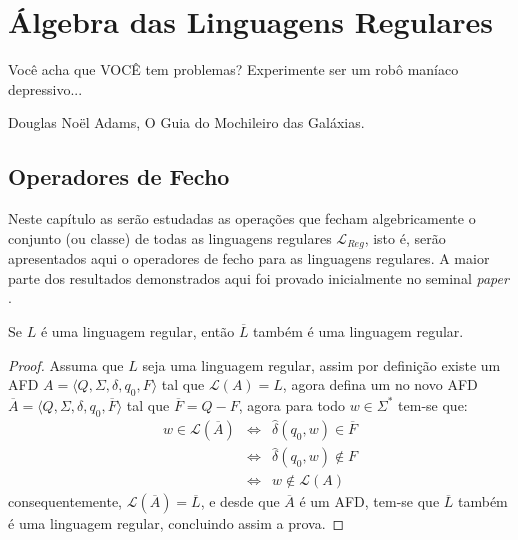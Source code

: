 \chapter{Álgebra das Linguagens Regulares}\label{cap:AlgebrasRegulares}



\epigraph{Você acha que VOCÊ tem problemas? Experimente ser um robô maníaco depressivo...}{Douglas Noël Adams, O Guia do Mochileiro das Galáxias.}

\section{Operadores de Fecho}

Neste capítulo as serão estudadas  as operações que fecham algebricamente o conjunto (ou classe) de todas as linguagens regulares $\mathcal{L}_{Reg}$, isto é, serão apresentados aqui o operadores de fecho para as linguagens regulares. A maior parte dos resultados demonstrados aqui foi provado inicialmente no seminal \textit{paper} \cite{rabin1959}.

\begin{theorem}\label{teo:FechoComplementoRegular}
	Se $L$ é uma linguagem regular, então $\overline{L}$ também é uma linguagem regular.
\end{theorem}

\begin{proof}
	Assuma que $L$ seja uma linguagem regular, assim por definição existe um AFD $A = \langle Q, \Sigma, \delta, q_0, F\rangle$ tal que $\mathcal{L}(A) = L$, agora defina um no novo AFD $\overline{A} = \langle Q, \Sigma, \delta, q_0, \overline{F} \rangle$ tal que $\overline{F} = Q - F$, agora para todo $w \in \Sigma^*$ tem-se que:
	\begin{eqnarray*}
		w \in \mathcal{L}(\overline{A}) & \Longleftrightarrow & \widehat{\delta}(q_0, w) \in \overline{F}\\
		& \Longleftrightarrow & \widehat{\delta}(q_0, w) \notin F\\
		& \Longleftrightarrow & w \notin \mathcal{L}(A)
	\end{eqnarray*}
	consequentemente, $\mathcal{L}(\overline{A}) = \overline{L}$, e desde que $\overline{A}$ é um AFD, tem-se que $\overline{L}$ também é uma linguagem regular, concluindo assim a prova.
\end{proof}


